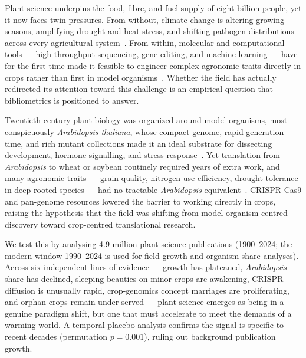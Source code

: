 

Plant science underpins the food, fibre, and fuel supply of eight billion
people, yet it now faces twin pressures. From without, climate change is
altering growing seasons, amplifying drought and heat stress, and shifting
pathogen distributions across every agricultural system~\cite{ipcc2022}. From
within, molecular and computational tools --- high-throughput sequencing, gene
editing, and machine learning --- have for the first time made it feasible to
engineer complex agronomic traits directly in crops rather than first in model
organisms~\cite{jackson2011}. Whether the field has actually redirected its
attention toward this challenge is an empirical question that bibliometrics is
positioned to answer.

Twentieth-century plant biology was organized around model organisms, most
conspicuously \textit{Arabidopsis thaliana}, whose compact genome, rapid
generation time, and rich mutant collections made it an ideal substrate for
dissecting development, hormone signalling, and stress
response~\cite{somerville1986,meyerowitz1989}. Yet translation from
\textit{Arabidopsis} to wheat or soybean routinely required years of extra work,
and many agronomic traits --- grain quality, nitrogen-use efficiency, drought
tolerance in deep-rooted species --- had no tractable \textit{Arabidopsis}
equivalent~\cite{feuillet2011,voss2015}. CRISPR-Cas9 and pan-genome resources
lowered the barrier to working directly in crops, raising the hypothesis that the
field was shifting from model-organism-centred discovery toward crop-centred
translational research.

We test this by analysing \num{4.9} million plant science publications
(1900--2024; the modern window 1990--2024 is used for field-growth and
organism-share analyses). Across six independent lines of evidence --- growth has
plateaued, \textit{Arabidopsis} share has declined, sleeping beauties on minor
crops are awakening, CRISPR diffusion is unusually rapid, crop-genomics concept
marriages are proliferating, and orphan crops remain under-served --- plant
science emerges as being in a genuine paradigm shift, but one that must accelerate
to meet the demands of a warming world. A temporal placebo analysis confirms the
signal is specific to recent decades (permutation $p = 0.001$), ruling out
background publication growth.

